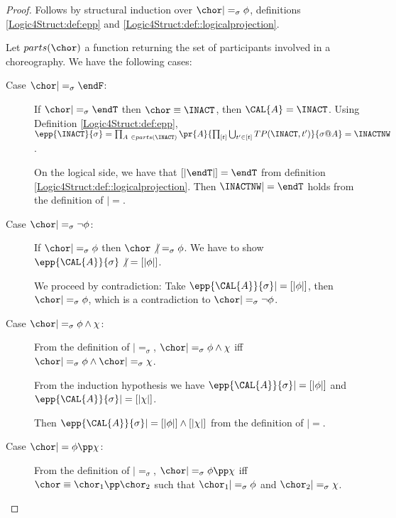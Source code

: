 \begin{proof}
  Follows by structural induction over $\chor |=_\sigma \phi $,
  definitions \ref{Logic4Struct:def:epp} and \ref{Logic4Struct:def::logicalprojection}.

Let $parts(\chor)$ a function returning the set of participants
involved in a choreography. We have the following cases:

\begin{description}


\item[Case $\chor |=_\sigma \endF$:]

  If $\chor |=_\sigma \endT$ then $\chor \equiv \INACT$, then $\CAL{A}
  = \INACT$.
  Using Definition \ref{Logic4Struct:def:epp}, $\epp{\INACT}{\sigma} = \prod_{A\ \in parts(\INACT)}
\pr{A}{\prod _{[t]} \bigcup_{t' \in [t]} TP(\INACT,
  t')}{\sigma @A} = \INACTNW$.

  On the logical side, we have that $[| \endT |] = \endT$ from
  definition \ref{Logic4Struct:def::logicalprojection}. Then $\INACTNW |= \endT$
  holds from the definition of $|=$.\\

\item[Case $\chor |=_\sigma \lnot \phi$:]

  If $\chor |=_\sigma \phi$ then $\chor \not |=_\sigma \phi$. We have
  to show $\epp{\CAL{A}}{\sigma} \not |= [| \phi |]$.

  We proceed by contradiction:  Take $\epp{\CAL{A}}{\sigma} |= [|
  \phi|]$, then $\chor |=_\sigma \phi$, which is a contradiction to
  $\chor |=_\sigma \lnot \phi$.

\item[Case $\chor |=_\sigma \phi \land \chi$:] 

  From  the definition of $|=_\sigma$, $\chor
  |=_\sigma  \phi \land \chi$ iff $\chor |=_\sigma \phi \land 
  \chor |=_\sigma \chi$. 
  
  From the induction hypothesis we have
  $\epp{\CAL{A}}{\sigma} |= [| \phi |] $ and $\epp{\CAL{A}}{\sigma} |=
  [| \chi |] $.

  Then $\epp{\CAL{A}}{\sigma} |= [| \phi |] \land [|
  \chi |]$ from the definition of $|=$. 

\item[Case $\chor |= \phi \pp \chi$:]

  From  the definition of $|=_\sigma$, $\chor |=_\sigma \phi \pp \chi$ iff $\chor \equiv \chor_1 \pp \chor_2$
  such that $\chor_1 |=_\sigma \phi $ and $\chor_2 |=_\sigma
  \chi$.


\end{description}
\end{proof}
